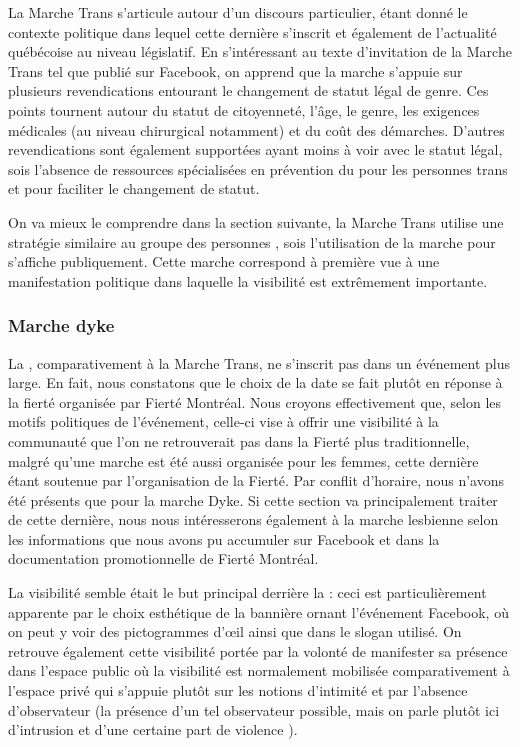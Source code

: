 La Marche Trans s'articule autour d'un discours particulier, étant donné le contexte politique dans lequel cette dernière s'inscrit et également de l'actualité québécoise au niveau législatif. 
En s'intéressant au texte d'invitation de la Marche Trans tel que publié sur Facebook, on apprend que la marche s'appuie sur plusieurs revendications entourant le changement de statut légal de genre. 
Ces points tournent autour du statut de citoyenneté, l'âge, le genre, les exigences médicales (au niveau chirurgical notamment) et du coût des démarches. 
D'autres revendications sont également supportées ayant moins à voir avec le statut légal, sois l'absence de ressources spécialisées en prévention du \vih{} pour les personnes trans et pour faciliter le changement de statut.

On va mieux le comprendre dans la section suivante, la Marche Trans utilise une stratégie similaire au groupe des personnes \dyke{}, sois l'utilisation de la marche pour s'affiche publiquement. 
Cette marche correspond à première vue à une manifestation politique dans laquelle la visibilité est extrêmement importante.

\subsubsection{Marche dyke}
\label{subsubsec:marchedyke}
La \dm{}, comparativement à la Marche Trans, ne s'inscrit pas dans un événement plus large. 
En fait, nous constatons que le choix de la date se fait plutôt en réponse à la fierté organisée par Fierté Montréal. 
Nous croyons effectivement que, selon les motifs politiques de l'événement, celle-ci vise à offrir une visibilité à la communauté \dyke{} que l'on ne retrouverait pas dans la Fierté plus traditionnelle, malgré qu'une marche est été aussi organisée pour les femmes, cette dernière étant soutenue par l'organisation de la Fierté. 
Par conflit d'horaire, nous n'avons été présents que pour la marche Dyke. 
Si cette section va principalement traiter de cette dernière, nous nous intéresserons également à la marche lesbienne selon les informations que nous avons pu accumuler sur Facebook et dans la documentation promotionnelle de Fierté Montréal.

La visibilité semble était le but principal derrière la \dm{}: ceci est particulièrement apparente par le choix esthétique de la bannière ornant l'événement Facebook, où on peut y voir des pictogrammes d'œil ainsi que dans le slogan utilisé. 
On retrouve également cette visibilité portée par la volonté de manifester sa présence dans l'espace public où la visibilité est normalement mobilisée comparativement à l'espace privé qui s'appuie plutôt sur les notions d'intimité et par l'absence d'observateur (la présence d'un tel observateur possible, mais on parle plutôt ici d'intrusion et d'une certaine part de violence ). 

